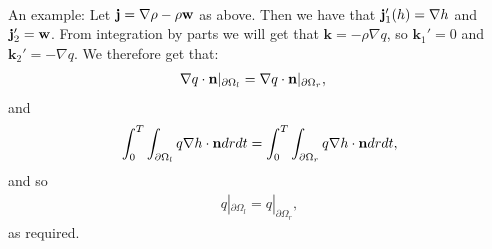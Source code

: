 	\\
	An example: Let $\mathbf j = \nabla \rho - \rho \mathbf{w}$ as above. Then we have that $\mathbf j_1'(h) = \nabla h$ and $\mathbf j_2' = \mathbf{w} $. From integration by parts we will get that $\mathbf k = - \rho \nabla q$, so $\mathbf k_1' = 0$ and $\mathbf k_2' = -  \nabla q$.
	We therefore get that:
	\begin{align*}
		& \nabla q \cdot \mathbf{n} |_{\partial \Omega_l} = \nabla q \cdot \mathbf{n} |_{\partial \Omega_r},
	\end{align*}
	and
	\begin{align*}
		\int_0^T \int_{\partial \Omega_l}  q \nabla h   \cdot \mathbf{n}    dr dt = \int_0^T \int_{\partial \Omega_r} q \nabla h  \cdot \mathbf{n}    dr dt,
	\end{align*}
	and so 
	\begin{align*}
		q |_{\partial \Omega_l} = q|_{\partial \Omega_r},
	\end{align*}
	as required.